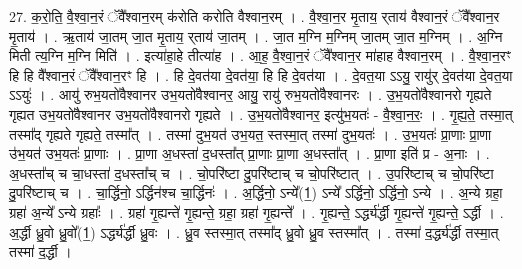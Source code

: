 \documentclass[17pt]{extarticle}
\begin{document}
27. क॒रो॒ति॒ वै॒श्वा॒न॒रं ॅवै᳚श्वान॒रम् क॑रोति करोति वैश्वान॒रम् । . वै॒श्वा॒न॒र मृ॒ताय॒ र्‌ताय॑ वैश्वान॒रं ॅवै᳚श्वान॒र मृ॒ताय॑ । . ऋ॒ताय॑ जा॒तम् जा॒त मृ॒ताय॒ र्‌ताय॑ जा॒तम् । . जा॒त म॒ग्नि म॒ग्निम् जा॒तम् जा॒त म॒ग्निम् । . अ॒ग्नि मिती त्य॒ग्नि म॒ग्नि मिति॑ । . इत्या॑हा॒हे तीत्या॑ह । . आ॒ह॒ वै॒श्वा॒न॒रं ॅवै᳚श्वान॒र मा॑हाह वैश्वान॒रम् । . वै॒श्वा॒न॒रꣳ हि हि वै᳚श्वान॒रं ॅवै᳚श्वान॒रꣳ हि । . हि दे॒वत॑या दे॒वत॑या॒ हि हि दे॒वत॑या । . दे॒वत॒या ऽऽयु॒ रायु॑र् दे॒वत॑या दे॒वत॒या ऽऽयुः॑ । . आयु॑ रुभ॒यतो॑वैश्वानर उभ॒यतो॑वैश्वानर॒ आयु॒ रायु॑ रुभ॒यतो॑वैश्वानरः । . उ॒भ॒यतो॑वैश्वानरो गृह्यते गृह्यत उभ॒यतो॑वैश्वानर उभ॒यतो॑वैश्वानरो गृह्यते । . उ॒भ॒यतो॑वैश्वानर॒ इत्यु॑भ॒यतः॑ - वै॒श्वा॒न॒रः॒ । . गृ॒ह्य॒ते॒ तस्मा॒त् तस्मा᳚द् गृह्यते गृह्यते॒ तस्मा᳚त् । . तस्मा॑ दुभ॒यत॑ उभ॒यत॒ स्तस्मा॒त् तस्मा॑ दुभ॒यतः॑ । . उ॒भ॒यतः॑ प्रा॒णाः प्रा॒णा उ॑भ॒यत॑ उभ॒यतः॑ प्रा॒णाः । . प्रा॒णा अ॒धस्ता॑ द॒धस्ता᳚त् प्रा॒णाः प्रा॒णा अ॒धस्ता᳚त् । . प्रा॒णा इति॑ प्र - अ॒नाः । . अ॒धस्ता᳚च् च चा॒धस्ता॑ द॒धस्ता᳚च् च । . चो॒परि॑ष्टा दु॒परि॑ष्टाच् च चो॒परि॑ष्टात् । . उ॒परि॑ष्टाच् च चो॒परि॑ष्टा दु॒परि॑ष्टाच् च । . चा॒र्द्धिनो॒ ऽर्द्धिन॑श्च चा॒र्द्धिनः॑ । . अ॒र्द्धिनो॒ ऽन्ये᳚(1॒) ऽन्ये᳚ ऽर्द्धिनो॒ ऽर्द्धिनो॒ ऽन्ये । . अ॒न्ये ग्रहा॒ ग्रहा॑ अ॒न्ये᳚ ऽन्ये ग्रहाः᳚ । . ग्रहा॑ गृ॒ह्यन्ते॑ गृ॒ह्यन्ते॒ ग्रहा॒ ग्रहा॑ गृ॒ह्यन्ते᳚ । . गृ॒ह्यन्ते॒ ऽर्द्ध्य॑र्द्धी गृ॒ह्यन्ते॑ गृ॒ह्यन्ते॒ ऽर्द्धी । . अ॒र्द्धी ध्रु॒वो ध्रु॒वो᳚(1॒) ऽर्द्ध्य॑र्द्धी ध्रु॒वः । . ध्रु॒व स्तस्मा॒त् तस्मा᳚द् ध्रु॒वो ध्रु॒व स्तस्मा᳚त् । . तस्मा॑ द॒र्द्ध्य॑र्द्धी तस्मा॒त् तस्मा॑ द॒र्द्धी । \newline
\end{document}
